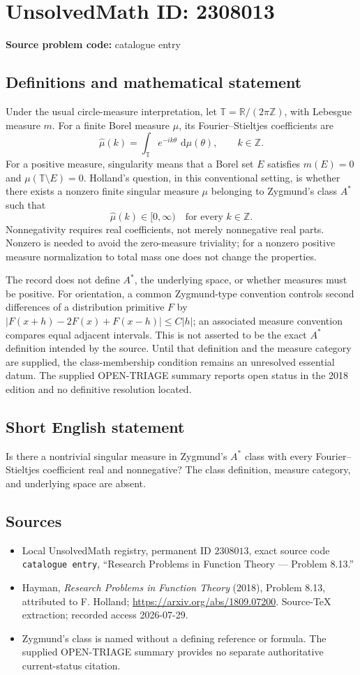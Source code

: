 \documentclass[11pt]{article}
\newcommand{\Z}{\mathbb{Z}}
\newcommand{\R}{\mathbb{R}}
\newcommand{\dd}{\,\mathrm{d}}
\begin{document}
\section*{UnsolvedMath ID: 2308013}
\textbf{Source problem code:} catalogue entry
\subsection{Definitions and mathematical statement}
Under the usual circle-measure interpretation, let \(\mathbb T=\R/(2\pi\Z)\), with Lebesgue measure \(m\). For a finite Borel measure \(\mu\), its Fourier--Stieltjes coefficients are
\[
\widehat\mu(k)=\int_{\mathbb T}e^{-ik\theta}\,\dd\mu(\theta),\qquad k\in\Z.
\]
For a positive measure, singularity means that a Borel set \(E\) satisfies \(m(E)=0\) and \(\mu(\mathbb T\setminus E)=0\). Holland's question, in this conventional setting, is whether there exists a nonzero finite singular measure \(\mu\) belonging to Zygmund's class \(A^*\) such that
\[
\widehat\mu(k)\in[0,\infty)\quad\text{for every }k\in\Z.
\]
Nonnegativity requires real coefficients, not merely nonnegative real parts. Nonzero is needed to avoid the zero-measure triviality; for a nonzero positive measure normalization to total mass one does not change the properties.

The record does not define \(A^*\), the underlying space, or whether measures must be positive. For orientation, a common Zygmund-type convention controls second differences of a distribution primitive \(F\) by \(|F(x+h)-2F(x)+F(x-h)|\le C|h|\); an associated measure convention compares equal adjacent intervals. This is not asserted to be the exact \(A^*\) definition intended by the source. Until that definition and the measure category are supplied, the class-membership condition remains an unresolved essential datum. The supplied OPEN-TRIAGE summary reports open status in the 2018 edition and no definitive resolution located.
\subsection{Short English statement}
Is there a nontrivial singular measure in Zygmund's \(A^*\) class with every Fourier--Stieltjes coefficient real and nonnegative? The class definition, measure category, and underlying space are absent.
\subsection{Sources}
\begin{itemize}
\item Local UnsolvedMath registry, permanent ID \(2308013\), exact source code \texttt{catalogue entry}, ``Research Problems in Function Theory --- Problem 8.13.''
\item Hayman, \emph{Research Problems in Function Theory} (2018), Problem 8.13, attributed to F. Holland; \url{https://arxiv.org/abs/1809.07200}. Source-TeX extraction; recorded access 2026-07-29.
\item Zygmund's class is named without a defining reference or formula. The supplied OPEN-TRIAGE summary provides no separate authoritative current-status citation.
\end{itemize}
\end{document}
